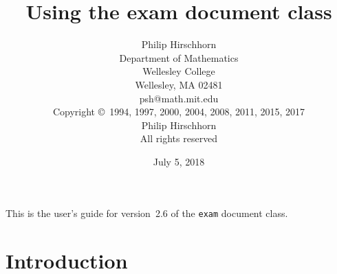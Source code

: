 \documentclass[12pt]{exam}
\newcommand{\docversion}{2.6}
\newcommand{\docdate}{July 5, 2018}
\begin{document}
\title{Using the exam document class}

\author{Philip Hirschhorn\\
  Department of Mathematics\\
  Wellesley College\\
  Wellesley, MA 02481\\
  psh@math.mit.edu\\[\bigskipamount]
  Copyright \copyright~1994, 1997, 2000, 2004, 2008, 2011, 2015, 2017\\
  Philip Hirschhorn\\
  All rights reserved}

\date{\docdate}

\maketitle

\begin{center}
  \small
  This is the user's guide for version~\docversion{} of the
  \verb"exam" document class. 
\end{center}

\tableofcontents

\section{Introduction}
\end{document}
